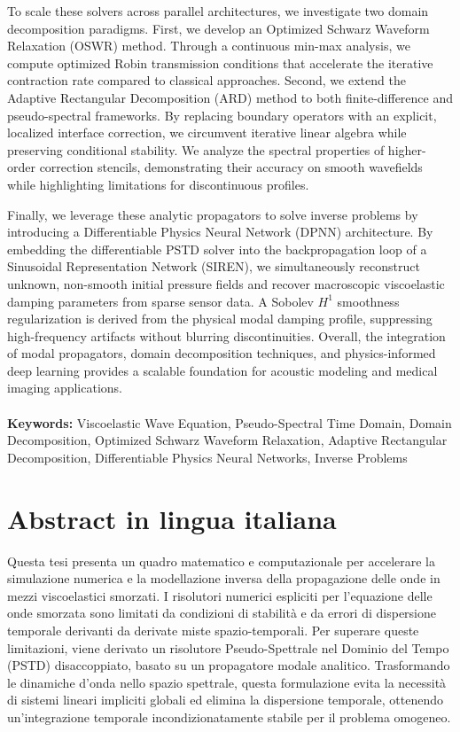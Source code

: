 \documentclass{Configuration_Files/PoliMi3i_thesis}
\begin{document}
To scale these solvers across parallel architectures, we investigate two domain decomposition paradigms. First, we develop an Optimized Schwarz Waveform Relaxation (OSWR) method. Through a continuous min-max analysis, we compute optimized Robin transmission conditions that accelerate the iterative contraction rate compared to classical approaches. Second, we extend the Adaptive Rectangular Decomposition (ARD) method to both finite-difference and pseudo-spectral frameworks. By replacing boundary operators with an explicit, localized interface correction, we circumvent iterative linear algebra while preserving conditional stability. We analyze the spectral properties of higher-order correction stencils, demonstrating their accuracy on smooth wavefields while highlighting limitations for discontinuous profiles.

Finally, we leverage these analytic propagators to solve inverse problems by introducing a Differentiable Physics Neural Network (DPNN) architecture. By embedding the differentiable PSTD solver into the backpropagation loop of a Sinusoidal Representation Network (SIREN), we simultaneously reconstruct unknown, non-smooth initial pressure fields and recover macroscopic viscoelastic damping parameters from sparse sensor data. A Sobolev $H^1$ smoothness regularization is derived from the physical modal damping profile, suppressing high-frequency artifacts without blurring discontinuities. Overall, the integration of modal propagators, domain decomposition techniques, and physics-informed deep learning provides a scalable foundation for acoustic modeling and medical imaging applications.
\\
\\
\textbf{Keywords:} Viscoelastic Wave Equation, Pseudo-Spectral Time Domain, Domain Decomposition, Optimized Schwarz Waveform Relaxation, Adaptive Rectangular Decomposition, Differentiable Physics Neural Networks, Inverse Problems

\chapter*{Abstract in lingua italiana}
Questa tesi presenta un quadro matematico e computazionale per accelerare la simulazione numerica e la modellazione inversa della propagazione delle onde in mezzi viscoelastici smorzati. I risolutori numerici espliciti per l'equazione delle onde smorzata sono limitati da condizioni di stabilità e da errori di dispersione temporale derivanti da derivate miste spazio-temporali. Per superare queste limitazioni, viene derivato un risolutore Pseudo-Spettrale nel Dominio del Tempo (PSTD) disaccoppiato, basato su un propagatore modale analitico. Trasformando le dinamiche d'onda nello spazio spettrale, questa formulazione evita la necessità di sistemi lineari impliciti globali ed elimina la dispersione temporale, ottenendo un'integrazione temporale incondizionatamente stabile per il problema omogeneo.
\end{document}
